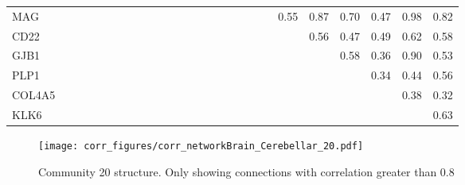 \begin{longtable}{lrrrrrrrrrrrrrrrrrrrrrrrrr}
MAG     &               &             &          &              &            &               &           &            &             &             &              &               &              &             &            &             &           &             &           &       0.55 &       0.87 &       0.70 &         0.47 &       0.98 &          0.82 \\
CD22    &               &             &          &              &            &               &           &            &             &             &              &               &              &             &            &             &           &             &           &            &       0.56 &       0.47 &         0.49 &       0.62 &          0.58 \\
GJB1    &               &             &          &              &            &               &           &            &             &             &              &               &              &             &            &             &           &             &           &            &            &       0.58 &         0.36 &       0.90 &          0.53 \\
PLP1    &               &             &          &              &            &               &           &            &             &             &              &               &              &             &            &             &           &             &           &            &            &            &         0.34 &       0.44 &          0.56 \\
COL4A5  &               &             &          &              &            &               &           &            &             &             &              &               &              &             &            &             &           &             &           &            &            &            &              &       0.38 &          0.32 \\
KLK6    &               &             &          &              &            &               &           &            &             &             &              &               &              &             &            &             &           &             &           &            &            &            &              &            &          0.63 \\
\end{longtable}


\begin{figure}[h!]
\centering
\texttt{[image: corr\_figures/corr\_networkBrain\_Cerebellar\_20.pdf]}
\caption{Community 20 structure. Only showing connections with correlation greater than 0.8}
\end{figure}




